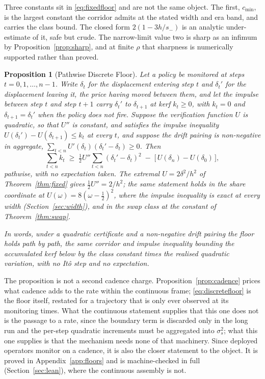 \documentclass[11pt,a4paper]{article}
\theoremstyle{definition}
\theoremstyle{plain}
\newtheorem{proposition}{Proposition}
\theoremstyle{remark}
\begin{document}
Three constants sit in \eqref{eq:fixedfloor} and are not the same object. The first, $c_{\min}$, is the largest constant the corridor admits at the stated width and era band, and carries the class
bound. The closed form $2(1 - 3h/s_-)$ is an analytic under-estimate of it, safe but crude. The narrow-limit value two is sharp as an infimum by Proposition~\ref{prop:sharp}, and at finite $\rho$ that
sharpness is numerically supported rather than proved.

\begin{proposition}[Pathwise Discrete Floor]\label{prop:discretefloor}
Let a policy be monitored at steps $t = 0, 1, \dots, n-1$. Write $\delta_t$ for the displacement entering step $t$ and $\delta_t'$ for the displacement leaving it, the price having moved between them, and
let the impulse between step $t$ and step $t+1$ carry $\delta_t'$ to $\delta_{t+1}$ at kerf $k_t \ge 0$, with $k_t = 0$ and $\delta_{t+1} = \delta_t'$ when the policy does not fire. 
Suppose the verification function $U$ is quadratic, so that $U''$ is constant, and satisfies the impulse inequality $U(\delta_t') - U(\delta_{t+1}) \le k_t$ at every $t$,
and suppose the drift pairing is non-negative in aggregate, $\sum_{t<n} U'(\delta_t)(\delta_t' - \delta_t) \ge 0$. Then 
\begin{equation}\label{eq:discretefloor}
\sum_{t<n} k_t \;\ge\; \tfrac12 U'' \sum_{t<n}
(\delta_t' - \delta_t)^2
\;-\; \big[\, U(\delta_n) - U(\delta_0) \,\big],
\end{equation}
pathwise, with no expectation taken. The extremal $U = 2\delta^2/h^2$ of Theorem~\ref{thm:fixed} gives $\tfrac12 U'' = 2/h^2$; the same statement holds in the share coordinate at $U(\omega) = 8(\omega -
\tfrac12)^2$, where the impulse inequality is exact at every width (Section~\ref{sec:width}), and in the swap class at the constant of Theorem~\ref{thm:swap}.
\end{proposition}

\emph{In words, under a quadratic certificate and a non-negative drift pairing the floor holds path by path, the same corridor and impulse inequality bounding the accumulated kerf below by the class constant
times the realised quadratic variation, with no It\^o step and no expectation.}

The proposition is not a second cadence charge. Proposition~\ref{prop:cadence} prices what cadence adds to the rate within the continuous frame; \eqref{eq:discretefloor} is the floor
itself, restated for a trajectory that is only ever observed at its monitoring times. What the continuous statement supplies that this one does not is the passage to a rate, since the boundary term is
discarded only in the long run and the per-step quadratic increments must be aggregated into $\sigma_s^2$; what this one supplies is that the mechanism needs none of that machinery. Since deployed operators
monitor on a cadence, it is also the closer statement to the object. It is proved in Appendix~\ref{app:floors} and is machine-checked in full (Section~\ref{sec:lean}), where the continuous assembly is not.
\end{document}
